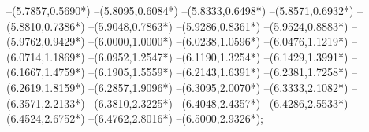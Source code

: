 {	--(5.7857,{0.5690*\yskala})
	--(5.8095,{0.6084*\yskala})
	--(5.8333,{0.6498*\yskala})
	--(5.8571,{0.6932*\yskala})
	--(5.8810,{0.7386*\yskala})
	--(5.9048,{0.7863*\yskala})
	--(5.9286,{0.8361*\yskala})
	--(5.9524,{0.8883*\yskala})
	--(5.9762,{0.9429*\yskala})
	--(6.0000,{1.0000*\yskala})
	--(6.0238,{1.0596*\yskala})
	--(6.0476,{1.1219*\yskala})
	--(6.0714,{1.1869*\yskala})
	--(6.0952,{1.2547*\yskala})
	--(6.1190,{1.3254*\yskala})
	--(6.1429,{1.3991*\yskala})
	--(6.1667,{1.4759*\yskala})
	--(6.1905,{1.5559*\yskala})
	--(6.2143,{1.6391*\yskala})
	--(6.2381,{1.7258*\yskala})
	--(6.2619,{1.8159*\yskala})
	--(6.2857,{1.9096*\yskala})
	--(6.3095,{2.0070*\yskala})
	--(6.3333,{2.1082*\yskala})
	--(6.3571,{2.2133*\yskala})
	--(6.3810,{2.3225*\yskala})
	--(6.4048,{2.4357*\yskala})
	--(6.4286,{2.5533*\yskala})
	--(6.4524,{2.6752*\yskala})
	--(6.4762,{2.8016*\yskala})
	--(6.5000,{2.9326*\yskala});
}
